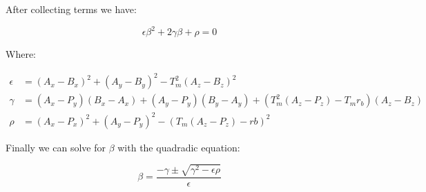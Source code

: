 \documentclass{article}
\begin{document}
\clearpage

After collecting terms we have:

\begin{equation}
\epsilon\beta^2 + 2\gamma\beta + \rho = 0
\end{equation}

Where:

\begin{equation*}
\begin{split}
\epsilon & = (A_x - B_x)^2 + (A_y - B_y)^2 - T_m^2(A_z - B_z)^2 \\
\gamma & =
(A_x - P_y)(B_x - A_x) + (A_y - P_y)(B_y - A_y) +
(T_m^2(A_z - P_z) - T_mr_b)(A_z - B_z) \\
\rho & = (A_x - P_x)^2 + (A_y - P_y)^2 - (T_m(A_z - P_z) - rb)^2
\end{split}
\end{equation*}

Finally we can solve for $\beta$ with the quadradic equation:

\begin{equation}
\beta = \frac{-\gamma \pm \sqrt{\gamma^2 - \epsilon\rho}}{\epsilon}
\end{equation}
\end{document}
